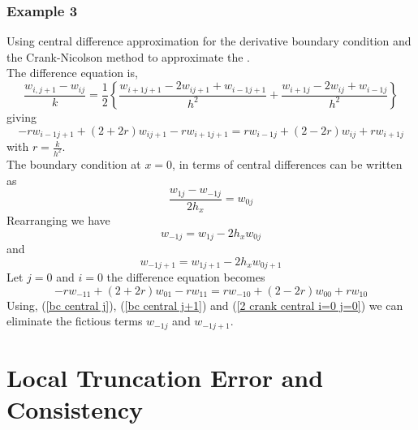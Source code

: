 \subsubsection{Example 3}
Using central difference approximation for the derivative boundary condition
and the Crank-Nicolson method to approximate the .\\
The difference equation is,
\[\frac{w_{i,j+1}-w_{ij}}{k}=\frac{1}{2}\left\{\frac{w_{i+1j+1}-2w_{ij+1}+w_{i-1j+1}}{h^2}+
\frac{w_{i+1j}-2w_{ij}+w_{i-1j}}{h^2}
\right\}
\]
giving
\begin{equation}
\label{2 crank central}
-rw_{i-1j+1}+(2+2r)w_{ij+1}-rw_{i+1j+1}
=
rw_{i-1j}+(2-2r)w_{ij}+rw_{i+1j}
\end{equation}
with $r=\frac{k}{h^2}$.\\
The boundary condition at $x=0$, in terms of central differences can be written as
\[
\frac{w_{1j}-w_{-1j}}{2h_x}=w_{0j} 
\]
Rearranging we have
\begin{equation}
\label{bc central j}
w_{-1j}=w_{1j}-2h_xw_{0j}
\end{equation}
and
\begin{equation}
\label{bc central j+1}
w_{-1j+1}=w_{1j+1}-2h_xw_{0j+1}
\end{equation}
Let $j=0$ and $i=0$ the difference equation becomes
\begin{equation}
\label{2 crank central i=0 j=0}
-rw_{-11}+(2+2r)w_{01}-rw_{11}
=
rw_{-10}+(2-2r)w_{00}+rw_{10}
\end{equation}
Using, (\ref{bc central j}), (\ref{bc central j+1}) and (\ref{2 crank central i=0 j=0}) we can eliminate the fictious terms $w_{-1j}$ and $w_{-1j+1}$.  


\section{Local Truncation Error and Consistency}

